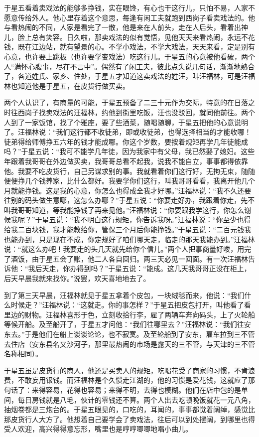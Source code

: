 \documentclass[12pt,UTF8]{ctexbook}
\begin{document}
于星五看着卖戏法的能够多挣钱，实在眼馋，有心也干这行儿，只怕不易，人家不愿意传给外人。他心里存着这个意思，每逢有闲工夫就跑到西岗子看卖戏法的。他与看热闹的不同，人家是看完了一散，他是来在人前头，走在人后头，看着出神儿，脸上总有笑容。日久啦，那卖戏法的似有觉悟，见他天天来看热闹，永远不花钱，既在江边站，就有望景的心。不学小戏法，不学大戏法，天天来看，定是别有心意，也许要上跳板（也许要学变戏法）吃这行儿。于星五的心意被他看破，两个人“满怀心腹事，尽在不言中”。偶然有了闲工夫，彼此点头说几句话，渐渐地熟合了，各道姓氏、家乡、住处，于星五才知道这卖戏法的姓汪，叫汪福林，可是汪福林也知道他是于星五，在皮货行做买卖。

两个人认识了，有商量的可能，于星五预备了二三十元作为交际，特意的在日落之时往西岗子找卖戏法的汪福林，约他到街里吃饭，汪也没驳回，就同他前往。两个人到了一家饭馆，找了个雅座，要了些酒菜，随喝随聊，于星五把他的心意说明了。汪福林说：“我们这行都不收徒弟，即或收徒弟，也得选择相当的才能收哪！徒弟得给师傅挣五六年的钱才能成哪。你这个岁数，要按着规矩再学几年徒能成吗？”于星五说：“我可不能学几年徒，因为我家中有父母，我已然娶了媳妇。这些年跟着我哥哥在外边做买卖，我哥哥总看不起我，说我不能自立，事事都得依靠他。我要不吃皮货行，自己另谋求别的事。我就看着你们这行好，无拘无束，随随便便挣几个钱养家，比什么都好。我要学你们这行，叫我哥哥看看，我离开他几个月就能挣钱。这是我的心意，你怎么也得成全我才好哪。”汪福林说：“我不久还要往别的码头做生意哪，这怎么办哪？”于星五说：“你要走好办，我跟着你走，先不叫我哥哥知道，等我能挣钱了再来见他。”汪福林说：“你要跟我学这行，你怎么谢候我呢？”于星五说：“我不明白这行规矩，你告诉我呀。”汪福林说：“你至少也得给我二百块钱，我才能教给你，管保三个月后你能挣钱。”于星五说：“二百元钱我也能办到，只是现在不成，你定规好了咱们哪天走，临走的那天我能办到。”汪福林说：“就这么办吧！我要走的头几天就先给你个信儿。”两个人把事商量好喽，用完了酒饭，由于星五会了账，他二人各自回归。两三天必见一回面。有一次汪福林告诉他：“我后天走，你办得到吗？”于星五说：“能成。这几天我哥哥正没在柜上，后天早晨我就来找你。”说罢，欢天喜地地去了。

到了第三天早晨，汪福林就见于星五拿着个皮包，一块绒毯而来，他说：“我们什么时候走？”汪福林说：“这就走。你的事怎样？”于星五把皮包打开，叫他看了看里边的财物。汪福林喜形于色，立刻收拾行李，雇了两辆车奔向码头，上了火轮船等候开船。及至船开了，于星五才问他：“我们往哪里去？”汪福林说：“我们往安东去。”于是他们在船上谈谈论论，也不寂寞。及至轮船到了安东，雇车拉到三不管去住店（安东县名又沙河子，那里最热闹的市场是露天的三不管，与天津的三不管名称相同）。

于星五虽是皮货行的商人，他还是买卖人的规矩，吃喝花受了商家的习惯，不肯浪费，不敢妄用银钱。而汪福林是个久惯走江湖的，他的习惯是爱花钱，这就应了那句话了：来得容易，花得也容易；来得不明，去得也模糊。他们在店中包的是单间，每日房钱就是八毛，伙计的零钱还不算。两个人出去吃顿晚饭就花一元八角，抽烟卷都是三炮台的。于星五眼见的，口吃的，耳闻的，事事都觉着阔绰，感觉比那皮货行人大方了。他想着自己要学会了卖戏法，往后可以到处摆阔，到哪里也得受人欢迎，高兴得得意忘形，嘴里也是哼哼唧唧地唱小曲儿。
\end{document}
